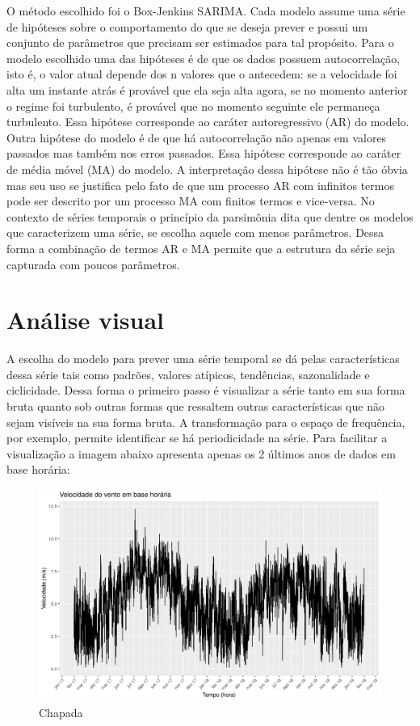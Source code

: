 \documentclass[
	12pt,				%
	openright,			%
	oneside,			%
	a4paper,			%
	english,			%
	french,				%
	spanish,			%
	brazil				%
	]{abntex2}
\begin{document}
O método escolhido foi o Box-Jenkins SARIMA.
Cada modelo assume uma série de hipóteses sobre o comportamento do que se deseja prever e possui um conjunto de parâmetros que precisam ser estimados para tal propósito. Para o modelo escolhido uma das hipóteses é de que os dados possuem autocorrelação, isto é, o valor atual depende dos n valores que o antecedem: se a velocidade foi alta um instante atrás é provável que ela seja alta agora, se no momento anterior o regime foi turbulento, é provável que no momento seguinte ele permaneça turbulento. Essa hipótese corresponde ao caráter autoregressivo (AR) do modelo. Outra hipótese do modelo é de que há autocorrelação não apenas em valores passados mas também nos erros passados. Essa hipótese corresponde ao caráter de média móvel (MA) do modelo. A interpretação dessa hipótese não é tão óbvia mas seu uso se justifica pelo fato de que um processo AR com infinitos termos pode ser descrito por um processo MA com finitos termos e vice-versa. No contexto de séries temporais o princípio da parsimônia dita que dentre os modelos que  caracterizem uma série, se escolha aquele com menos parâmetros. Dessa forma a combinação de termos AR e MA permite que a estrutura da série seja capturada com poucos parâmetros.

\section{Análise visual}

A escolha do modelo para prever uma série temporal se dá pelas características dessa série tais como padrões, valores atípicos, tendências, sazonalidade e ciclicidade. Dessa forma o primeiro passo é visualizar a série tanto em sua forma bruta quanto sob outras formas que ressaltem outras características que não sejam visíveis na sua forma bruta. A transformação para o espaço de frequência, por exemplo, permite identificar se há periodicidade na série. Para facilitar a visualização a imagem abaixo apresenta apenas os 2 últimos anos de dados em base horária:

\begin{figure}[h]
    \centering
	\includegraphics[width=\textwidth]{entire_series_hourly_basis}
	\caption{Chapada}
\end{figure}
\FloatBarrier
\end{document}
